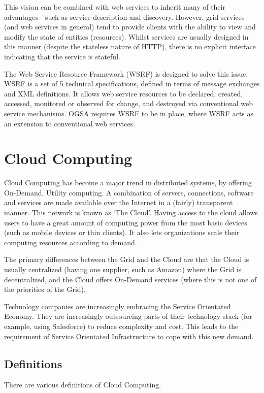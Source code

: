 \documentclass{article}
\begin{document}
This vision can be combined with web services to inherit many of their advantages - such as service description and discovery. However, grid services (and web services in general) tend to provide clients with the ability to view and modify the state of entities (resources). Whilst services are usually designed in this manner (despite the stateless nature of HTTP), there is no explicit interface indicating that the service is stateful.

The Web Service Resource Framework (WSRF) is designed to solve this issue. WSRF is a set of 5 technical specifications, defined in terms of message exchanges and XML definitions. It allows web service resources to be declared, created, accessed, monitored or observed for change, and destroyed via conventional web service mechanisms. OGSA requires WSRF to be in place, where WSRF acts as an extension to conventional web services.

\section{Cloud Computing}
Cloud Computing has become a major trend in distributed systems, by offering On-Demand, Utility computing. A combination of servers, connections, software and services are made available over the Internet in a (fairly) transparent manner. This network is known as `The Cloud'. Having access to the cloud allows users to have a great amount of computing power from the most basic devices (such as mobile devices or thin clients). It also lets organizations scale their computing resources according to demand.

The primary differences between the Grid and the Cloud are that the Cloud is usually centralized (having one supplier, such as Amazon) where the Grid is decentralized, and the Cloud offers On-Demand services (where this is not one of the priorities of the Grid).

Technology companies are increasingly embracing the Service Orientated Economy. They are increasingly outsourcing parts of their technology stack (for example, using Salesforce) to reduce complexity and cost. This leads to the requirement of Service Orientated Infrastructure to cope with this new demand.

\subsection{Definitions}
There are various definitions of Cloud Computing.
\end{document}
